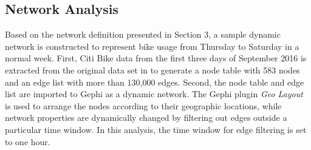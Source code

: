 \documentclass[times, 10pt,twocolumn]{article}
\begin{document}
%
%
%
%


\subsection{Network Analysis}
Based on the network definition presented in Section 3, a sample dynamic network is constructed to represent bike usage from Thursday to Saturday in a normal week. First, Citi Bike data from the first three days of September 2016 is extracted from the original data set in \cite{dataset} to generate a node table with 583 nodes and an edge list with more than 130,000 edges. Second, the node table and edge list are imported to Gephi as a dynamic network. The Gephi plugin \textit{Geo Layout} is used to arrange the nodes according to their geographic locations, while network properties are dynamically changed by filtering out edges outside a particular time window. In this analysis, the time window for edge filtering is set to one hour.\\
\end{document}
